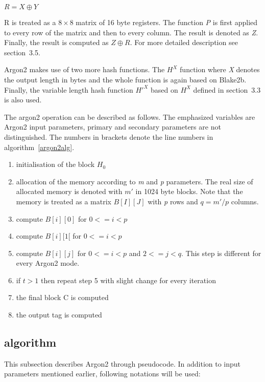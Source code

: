 \documentclass[nolof]{fithesis3}
\begin{document}
\(R = X \oplus Y \)

R is treated as a \(8 \times 8 \) matrix of 16 byte registers. The function \emph{P} is first applied to every row of the matrix and then to every column. The result is denoted as \emph{Z}. Finally, the result is computed as \(Z \oplus R\). For more detailed description see \parencite{argon2draft}{section~3.5}.

Argon2 makes use of two more hash functions. The \emph{\(H^X\)} function where \emph{X} denotes the output length in bytes and the whole function is again based on Blake2b. Finally, the variable length hash function \emph{\(H'^X\)} based on \emph{\(H^X\)} defined in \parencite{argon2draft}{section~3.3} is also used.

The argon2 operation can be described as follows. The emphasized variables are Argon2 input parameters, primary and secondary parameters are not distinguished. The numbers in brackets denote the line numbers in algorithm~\ref{argon2alg}.

\begin{enumerate}
\item initialisation of the block \(H_0\)

\item allocation of the memory according to \emph{m} and \emph{p} parameters. The real size of allocated memory is denoted with \(m'\) in 1024 byte blocks. Note that the memory is treated as a matrix \(B[I][J]\) with \emph{p} rows and \(q = m' / p\) columns.

\item compute \(B[i][0]\) for \(0 <= i < p\)

\item compute \(B[i][1[\) for \(0 <= i < p\)

\item compute \(B[i][j]\) for \(0 <= i < p\) and \(2 <= j < q\). This step is different for every Argon2 mode.

\item if \emph{\(t\)}\(> 1\) then repeat step 5 with slight change for every iteration

\item the final block C is computed

\item the output tag is computed
\end{enumerate}

\subsection{algorithm}
This subsection describes Argon2 through pseudocode. In addition to input parameters mentioned earlier, following notations will be used:
\end{document}
